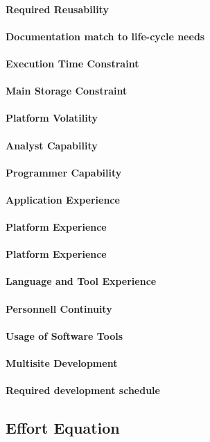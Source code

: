 \paragraph{Required Reusability}
\paragraph{Documentation match to life-cycle needs}
\paragraph{Execution Time Constraint}
\paragraph{Main Storage Constraint}
\paragraph{Platform Volatility}
\paragraph{Analyst Capability}
\paragraph{Programmer Capability}
\paragraph{Application Experience}
\paragraph{Platform Experience}
\paragraph{Platform Experience}
\paragraph{Language and Tool Experience}
\paragraph{Personnell Continuity}
\paragraph{Usage of Software Tools}
\paragraph{Multisite Development}
\paragraph{Required development schedule}

\subsection{Effort Equation} %
\label{sub:effort_equation}
